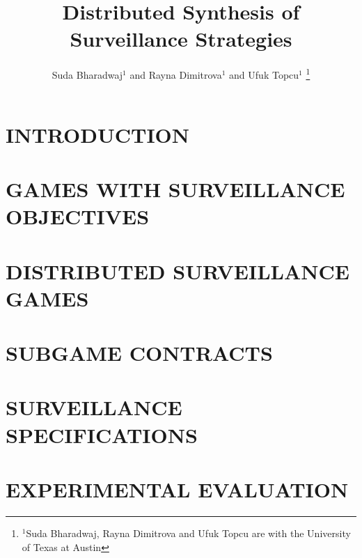 \documentclass[letterpaper, 10 pt, conference]{ieeeconf}  %
\title{\LARGE \bf Distributed Synthesis of Surveillance Strategies}
\author{Suda Bharadwaj$^{1}$ and Rayna Dimitrova$^{1}$ and Ufuk Topcu$^{1}$%
\thanks{$^{1}$Suda Bharadwaj, Rayna Dimitrova and Ufuk Topcu are with the University of Texas at Austin}%
}
\begin{document}
\maketitle
\thispagestyle{empty}
\pagestyle{empty}


\begin{abstract}

\end{abstract}


\section{INTRODUCTION}




\section{GAMES WITH SURVEILLANCE OBJECTIVES}





\section{DISTRIBUTED SURVEILLANCE GAMES}


\section{SUBGAME CONTRACTS}


\section{SURVEILLANCE SPECIFICATIONS}


\section{EXPERIMENTAL EVALUATION}\label{sec:experiments}
\end{document}
